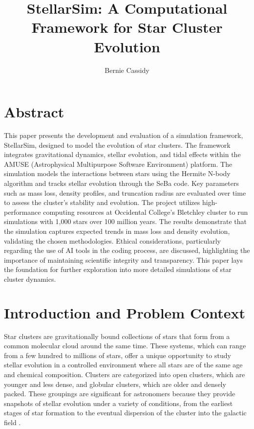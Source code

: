 \documentclass[10pt,twocolumn]{article}
\title{StellarSim: A Computational Framework for Star Cluster Evolution}
\author{Bernie Cassidy}
\affiliation{Occidental College}
\begin{document}
\maketitle

\section{Abstract}

This paper presents the development and evaluation of a simulation framework, StellarSim, designed to model the evolution of star clusters. The framework integrates gravitational dynamics, stellar evolution, and tidal effects within the AMUSE (Astrophysical Multipurpose Software Environment) platform. The simulation models the interactions between stars using the Hermite N-body algorithm and tracks stellar evolution through the SeBa code. Key parameters such as mass loss, density profiles, and truncation radius are evaluated over time to assess the cluster's stability and evolution. The project utilizes high-performance computing resources at Occidental College's Bletchley cluster to run simulations with 1,000 stars over 100 million years. The results demonstrate that the simulation captures expected trends in mass loss and density evolution, validating the chosen methodologies. Ethical considerations, particularly regarding the use of AI tools in the coding process, are discussed, highlighting the importance of maintaining scientific integrity and transparency. This paper lays the foundation for further exploration into more detailed simulations of star cluster dynamics.

\section{Introduction and Problem Context}
Star clusters are gravitationally bound collections of stars that form from a common molecular cloud around the same time. These systems, which can range from a few hundred to millions of stars, offer a unique opportunity to study stellar evolution in a controlled environment where all stars are of the same age and chemical composition. Clusters are categorized into open clusters, which are younger and less dense, and globular clusters, which are older and densely packed. These groupings are significant for astronomers because they provide snapshots of stellar evolution under a variety of conditions, from the earliest stages of star formation to the eventual dispersion of the cluster into the galactic field \cite{Takahashi2000}.
\end{document}
